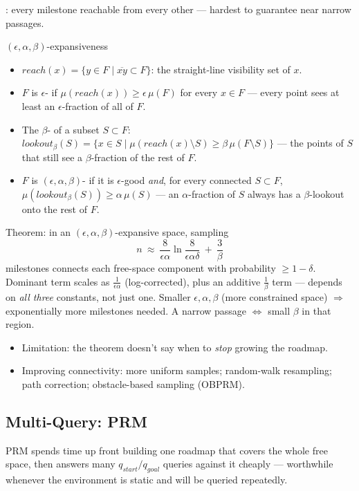: every milestone reachable from every other — hardest to guarantee near narrow passages.
\begin{defbox}{$(\epsilon,\alpha,\beta)$-expansiveness}
\begin{itemize}
\item $reach(x)=\{y\in F\mid \overline{xy}\subset F\}$: the straight-line visibility set of $x$.
\item $F$ is $\epsilon$- if $\mu(reach(x))\ge\epsilon\,\mu(F)$ for every $x\in F$ --- every point sees at least an $\epsilon$-fraction of all of $F$.
\item The $\beta$- of a subset $S\subset F$: $lookout_\beta(S)=\{x\in S\mid \mu(reach(x)\setminus S)\ge\beta\,\mu(F\setminus S)\}$ --- the points of $S$ that still see a $\beta$-fraction of the rest of $F$.
\item $F$ is $(\epsilon,\alpha,\beta)$- if it is $\epsilon$-good \emph{and}, for every connected $S\subset F$, $\mu(lookout_\beta(S))\ge\alpha\,\mu(S)$ --- an $\alpha$-fraction of $S$ always has a $\beta$-lookout onto the rest of $F$.
\end{itemize}
\end{defbox}
Theorem: in an $(\epsilon,\alpha,\beta)$-expansive space, sampling
\[
n\ \approx\ \frac{8}{\epsilon\alpha}\ln\frac{8}{\epsilon\alpha\delta}\ +\ \frac3\beta
\]
milestones connects each free-space component with probability $\ge1-\delta$. Dominant term scales as $\tfrac1{\epsilon\alpha}$ (log-corrected), plus an additive $\tfrac1\beta$ term --- depends on \emph{all three} constants, not just one. Smaller $\epsilon,\alpha,\beta$ (more constrained space) $\Rightarrow$ exponentially more milestones needed. A narrow passage $\Leftrightarrow$ small $\beta$ in that region.
\begin{itemize}
\item Limitation: the theorem doesn't say when to \emph{stop} growing the roadmap.
\item Improving connectivity: more uniform samples; random-walk resampling; path correction; obstacle-based sampling (OBPRM).
\end{itemize}

\subsection{Multi-Query: PRM}
PRM spends time up front building one roadmap that covers the whole free space, then answers many $q_{start}/q_{goal}$ queries against it cheaply --- worthwhile whenever the environment is static and will be queried repeatedly.

